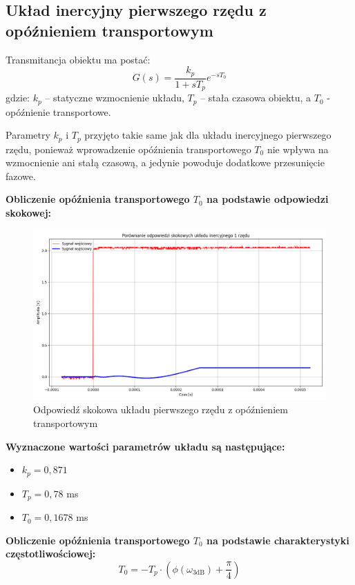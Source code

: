 \documentclass[12pt,a4paper]{article}
\begin{document}
	\subsection{Układ inercyjny pierwszego rzędu z opóźnieniem transportowym}
	Transmitancja obiektu ma postać:
	\begin{equation}
		G(s) = \frac{k_p}{1 + sT_p} e^{-sT_0}
	\end{equation}
	gdzie: \(k_p\) – statyczne wzmocnienie układu, \(T_p\) – stała czasowa obiektu, a \(T_0\) - opóźnienie transportowe.
	
	Parametry $k_p$ i $T_p$ przyjęto takie same jak dla układu inercyjnego pierwszego rzędu, ponieważ wprowadzenie opóźnienia transportowego $T_0$ nie wpływa na wzmocnienie ani stałą czasową, a jedynie powoduje dodatkowe przesunięcie fazowe.
	
	\textbf{Obliczenie opóźnienia transportowego $T_0$ na podstawie odpowiedzi skokowej:}
	\begin{figure}[H]
		\centering
		\includegraphics[width=1\linewidth]{zdjecia/odp_skok_z_opz.png}
		\caption{Odpowiedź skokowa układu pierwszego rzędu z opóźnieniem transportowym}
		\label{fig:odp_skok_z_opz}
	\end{figure}
	
	\textbf{Wyznaczone wartości parametrów układu są następujące:}
	\begin{itemize}
		\item $k_p = 0{,}871$
		\item $T_p = 0{,}78$ ms
		\item $T_0 = 0{,}1678$ ms
	\end{itemize}
	
	\textbf{Obliczenie opóźnienia transportowego $T_0$ na podstawie charakterystyki częstotliwościowej:}
	\begin{equation}
		T_0 = -T_p \cdot \left( \phi(\omega_{3\text{dB}}) + \frac{\pi}{4} \right)
	\end{equation}
	
\end{document}
